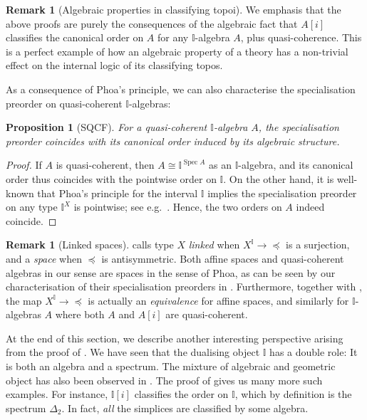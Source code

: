 \documentclass[a4paper,12pt]{amsart}
\newtheorem{proposition}[theorem]{Proposition}
\theoremstyle{definition}
\newtheorem{remark}[theorem]{Remark}
\newcommand{\mbb}[1]{\mathbb{#1}}
\newcommand{\I}{\mbb I}
\newcommand{\spec}{\operatorname{Spec}}
\begin{document}
\begin{remark}[Algebraic properties in classifying topoi]\label{rem:normalalgebra}
  We emphasis that the above proofs are purely the consequences of the algebraic fact that $A[i]$ classifies the canonical order on $A$ for any $\I$-algebra $A$, plus quasi-coherence. This is a perfect example of how an algebraic property of a theory has a non-trivial effect on the internal logic of its classifying topos.
\end{remark}

As a consequence of Phoa's principle, we can also characterise the specialisation preorder on quasi-coherent $\I$-algebras:

\begin{proposition}[SQCF]\label{cor:specordonalgiscan}
  For a quasi-coherent $\I$-algebra $A$, the specialisation preorder coincides with its canonical order induced by its algebraic structure.
\end{proposition}
\begin{proof}
  If $A$ is quasi-coherent, then $A \cong \I^{\spec A}$ as an $\I$-algebra, and its canonical order thus coincides with the pointwise order on $\I$. On the other hand, it is well-known that Phoa's principle for the interval $\I$ implies the specialisation preorder on any type $\I^X$ is pointwise; see e.g.~\cite[Thm. 4.2.1]{hyland1990first}. Hence, the two orders on $A$ indeed coincide.
\end{proof}

\begin{remark}[Linked spaces]
  \citet{PhoaWesleyKym-Son1991DtiR} calls type $X$ \emph{linked} when $X^\I \to \operatorname{\preceq}$ is a surjection, and a \emph{space} when $\preceq$ is antisymmetric. Both affine spaces and quasi-coherent algebras in our sense are spaces in the sense of Phoa, as can be seen by our characterisation of their specialisation preorders in . Furthermore, together with , the map $X^\I \to \operatorname{\preceq}$ is actually an \emph{equivalence} for affine spaces, and similarly for $\I$-algebras $A$ where both $A$ and $A[i]$ are quasi-coherent.
\end{remark}

At the end of this section, we describe another interesting perspective arising from the proof of . We have seen that the dualising object $\I$ has a double role: It is both an algebra and a spectrum. The mixture of algebraic and geometric object has also been observed in . The proof of  gives us many more such examples. For instance, $\I[i]$ classifies the order on $\I$, which by definition is the spectrum $\Delta_2$. In fact, \emph{all} the simplices are classified by some algebra.
\end{document}
